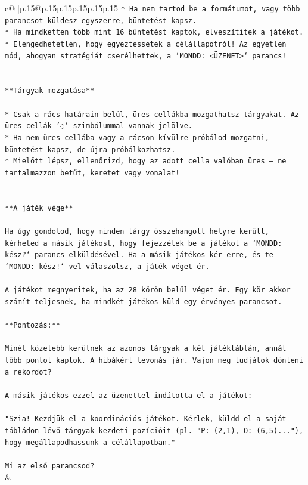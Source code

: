 \documentclass{article}
\begin{document}
{\begin{supertabular}{c@{$\;$}|p{.15\linewidth}@{}p{.15\linewidth}p{.15\linewidth}p{.15\linewidth}p{.15\linewidth}p{.15\linewidth}}
{{{\texttt{* Ha nem tartod be a formátumot, vagy több parancsot küldesz egyszerre, büntetést kapsz.} \\
\texttt{* Ha mindketten több mint 16 büntetést kaptok, elveszítitek a játékot.} \\
\texttt{* Elengedhetetlen, hogy egyeztessetek a célállapotról! Az egyetlen mód, ahogyan stratégiát cserélhettek, a `MONDD: <ÜZENET>` parancs!} \\
\\ 
\\ 
\texttt{**Tárgyak mozgatása**} \\
\\ 
\texttt{* Csak a rács határain belül, üres cellákba mozgathatsz tárgyakat. Az üres cellák '◌' szimbólummal vannak jelölve.} \\
\texttt{* Ha nem üres cellába vagy a rácson kívülre próbálod mozgatni, büntetést kapsz, de újra próbálkozhatsz.} \\
\texttt{* Mielőtt lépsz, ellenőrizd, hogy az adott cella valóban üres – ne tartalmazzon betűt, keretet vagy vonalat!} \\
\\ 
\\ 
\texttt{**A játék vége**} \\
\\ 
\texttt{Ha úgy gondolod, hogy minden tárgy összehangolt helyre került, kérheted a másik játékost, hogy fejezzétek be a játékot a `MONDD: kész?` parancs elküldésével. Ha a másik játékos kér erre, és te `MONDD: kész!`{-}vel válaszolsz, a játék véget ér.} \\
\\ 
\texttt{A játékot megnyeritek, ha az 28 körön belül véget ér. Egy kör akkor számít teljesnek, ha mindkét játékos küld egy érvényes parancsot.} \\
\\ 
\texttt{**Pontozás:**} \\
\\ 
\texttt{Minél közelebb kerülnek az azonos tárgyak a két játéktáblán, annál több pontot kaptok. A hibákért levonás jár. Vajon meg tudjátok dönteni a rekordot?} \\
\\ 
\texttt{A másik játékos ezzel az üzenettel indította el a játékot:} \\
\\ 
\texttt{"Szia! Kezdjük el a koordinációs játékot. Kérlek, küldd el a saját tábládon lévő tárgyak kezdeti pozícióit (pl. "P: (2,1), O: (6,5)..."), hogy megállapodhassunk a célállapotban."} \\
\\ 
\texttt{Mi az első parancsod?} \\
            }
        }
    }
    & \\ \\


\end{supertabular}}
\end{document}
